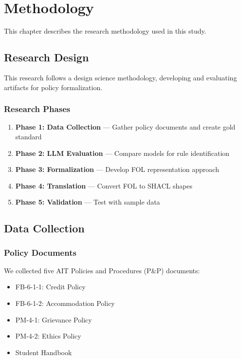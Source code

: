 \chapter{Methodology}
\label{ch:methodology}

This chapter describes the research methodology used in this study.

\section{Research Design}

This research follows a design science methodology, developing and evaluating artifacts for policy formalization.

\subsection{Research Phases}

\begin{enumerate}
    \item \textbf{Phase 1: Data Collection} --- Gather policy documents and create gold standard
    \item \textbf{Phase 2: LLM Evaluation} --- Compare models for rule identification
    \item \textbf{Phase 3: Formalization} --- Develop FOL representation approach
    \item \textbf{Phase 4: Translation} --- Convert FOL to SHACL shapes
    \item \textbf{Phase 5: Validation} --- Test with sample data
\end{enumerate}

\section{Data Collection}

\subsection{Policy Documents}

We collected five AIT Policies and Procedures (P\&P) documents:

\begin{itemize}
    \item FB-6-1-1: Credit Policy
    \item FB-6-1-2: Accommodation Policy
    \item PM-4-1: Grievance Policy
    \item PM-4-2: Ethics Policy
    \item Student Handbook
\end{itemize}

